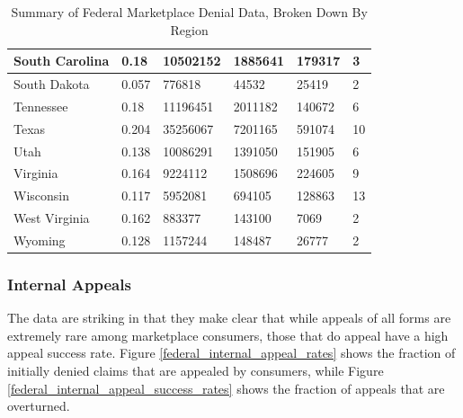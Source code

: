 \documentclass[12pt, a4paper]{report}
\begin{document}
\begin{table}[!ht]
\begin{tabular}{|p{3cm}|p{2cm}|p{2cm}|p{2cm}|p{3cm}|p{2cm}|}
		South Carolina & 0.18 & 10502152 & 1885641 & 179317 & 3 \\ \hline
		South Dakota & 0.057 & 776818 & 44532 & 25419 & 2 \\ \hline
		Tennessee & 0.18 & 11196451 & 2011182 & 140672 & 6 \\ \hline
		Texas & 0.204 & 35256067 & 7201165 & 591074 & 10 \\ \hline
		Utah & 0.138 & 10086291 & 1391050 & 151905 & 6 \\ \hline
		Virginia & 0.164 & 9224112 & 1508696 & 224605 & 9 \\ \hline
		Wisconsin & 0.117 & 5952081 & 694105 & 128863 & 13 \\ \hline
		West Virginia & 0.162 & 883377 & 143100 & 7069 & 2 \\ \hline
		Wyoming & 0.128 & 1157244 & 148487 & 26777 & 2 \\ \hline
	\end{tabular}
\caption{Summary of Federal Marketplace Denial Data, Broken Down By Region}
	\label{federal_denial_data_by_region_table}
\end{table}

\subsubsection{Internal Appeals}

The data are striking in that they make clear that while appeals of all forms are extremely rare among marketplace consumers, those that do appeal have a high appeal success rate. Figure \ref{federal_internal_appeal_rates} shows the fraction of initially denied claims that are appealed by consumers, while Figure \ref{federal_internal_appeal_success_rates} shows the fraction of appeals
that are overturned.\\
\end{document}
